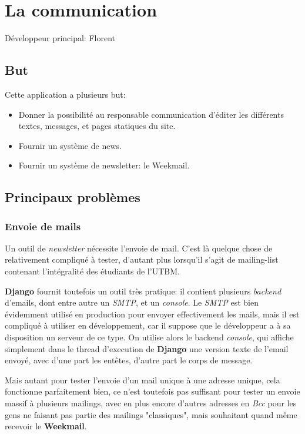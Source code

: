 \documentclass[a4paper]{report}
\begin{document}
\chapter{La communication}
\label{sec:la_communication}
\par Développeur principal: Florent

\section{But}
\label{sub:but}
\par Cette application a plusieurs but:
\begin{itemize}
    \item Donner la possibilité au responsable communication d'éditer les différents textes, messages, et pages
        statiques du site.
    \item Fournir un système de news.
    \item Fournir un système de newsletter: le Weekmail.
\end{itemize}

\section{Principaux problèmes}
\label{sec:principaux_problemes}

\subsection{Envoie de mails}
\label{sub:envoie_de_mails}
\par Un outil de \emph{newsletter} nécessite l'envoie de mail. C'est là quelque chose de relativement compliqué à
tester, d'autant plus lorsqu'il s'agit de mailing-list contenant l'intégralité des étudiants de l'UTBM.

\par \textbf{Django} fournit toutefois un outil très pratique: il contient plusieurs \emph{backend} d'emails, dont entre
autre un \emph{SMTP}, et un \emph{console}. Le \emph{SMTP} est bien évidemment utilisé en production pour envoyer
effectivement les mails, mais il est compliqué à utiliser en développement, car il suppose que le développeur a à sa
disposition un serveur de ce type. On utilise alors le backend \emph{console}, qui affiche simplement dans le thread
d'execution de \textbf{Django} une version texte de l'email envoyé, avec d'une part les entêtes, d'autre part le corps
de message.

\par Mais autant pour tester l'envoie d'un mail unique à une adresse unique, cela fonctionne parfaitement bien, ce n'est
toutefois pas suffisant pour tester un envoie massif à plusieurs mailings, avec en plus encore d'autres adresses en
\emph{Bcc} pour les gens ne faisant pas partie des mailings "classiques", mais souhaitant quand même recevoir le
\textbf{Weekmail}.
\end{document}
